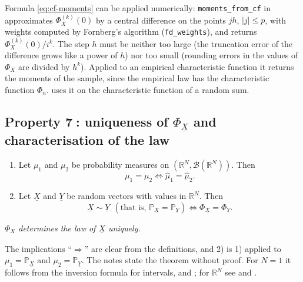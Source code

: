 \begin{remark}[computational]\label{rem:cf-code-moments}
Formula \eqref{eq:cf-moments} can be applied numerically: \texttt{moments\_from\_cf} in
 approximates $\Phi_X^{(k)}(0)$ by a central difference on
the points $jh$, $|j|\le p$, with weights computed by Fornberg's algorithm (\texttt{fd\_weights}),
and returns $\Phi_X^{(k)}(0)/i^k$. The step $h$ must be neither too large (the truncation error
of the difference grows like a power of $h$) nor too small (rounding errors in the values of
$\Phi_X$ are divided by $h^k$). Applied to an empirical characteristic function it returns the
moments of the sample, since the empirical law has the characteristic function $\Phi_n$.
 uses it on the characteristic function of a random sum.
\end{remark}


\subsection{Property \textcircled{\scriptsize 7}: uniqueness of \texorpdfstring{$\Phi_{\underline X}$}{the characteristic function} and characterisation of the law}\label{sec:cf-uniqueness}

\begin{theorem}\label{thm:cf-uniqueness}
\begin{enumerate}[label=\arabic*)]
  \item Let $\mu_1$ and $\mu_2$ be probability measures on
    $(\mathbb R^N,\mathcal B(\mathbb R^N))$. Then
    \[
      \mu_1=\mu_2\iff\hat\mu_1=\hat\mu_2 .
    \]
  \item Let $\underline X$ and $\underline Y$ be random vectors with values in $\mathbb R^N$.
    Then
    \[
      \underline X\sim\underline Y\ \ (\text{that is, }\mathbb P_{\underline X}=\mathbb P_{\underline Y})
      \iff\Phi_{\underline X}=\Phi_{\underline Y}.
    \]
\end{enumerate}
\emph{$\Phi_{\underline X}$ determines the law of $\underline X$ uniquely.}
\end{theorem}

The implications ``$\Rightarrow$'' are clear from the definitions, and 2) is 1) applied to
$\mu_1=\mathbb P_{\underline X}$ and $\mu_2=\mathbb P_{\underline Y}$. The notes state the theorem
without proof. For $N=1$ it follows from the inversion formula for intervals,
\citet[Section~26, ``Inversion and the Uniqueness Theorem'']{billingsley} and
\citet[Section~3.3.1]{durrett}; for $\mathbb R^N$ see \citet[Section~29, ``Characteristic
Functions'']{billingsley} and \citet[Section~3.10]{durrett}.

